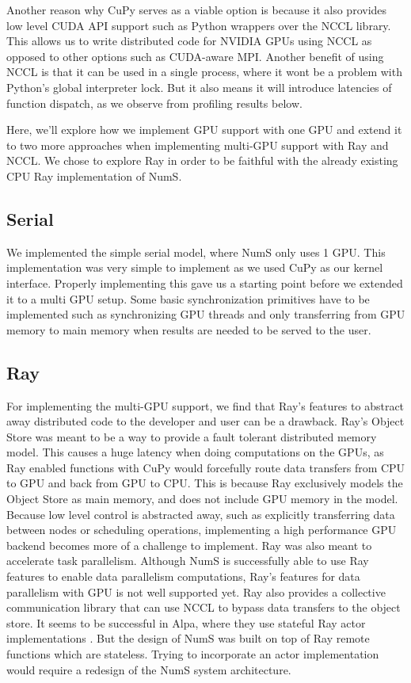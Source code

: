 \documentclass{article}
\begin{document}
Another reason why CuPy serves as a viable option is because it also provides low level CUDA API support such as Python wrappers over the NCCL library. This allows us to write distributed code for NVIDIA GPUs using NCCL as opposed to other options such as CUDA-aware MPI. Another benefit of using NCCL is that it can be used in a single process, where it wont be a problem with Python's global interpreter lock. But it also means it will introduce latencies of function dispatch, as we observe from profiling results below. 

Here, we'll explore how we implement GPU support with one GPU and extend it to two more approaches when implementing multi-GPU support with Ray and NCCL. We chose to explore Ray in order to be faithful with the already existing CPU Ray implementation of NumS.

\subsection{Serial}
We implemented the simple serial model, where NumS only uses 1 GPU. This implementation was very simple to implement as we used CuPy as our kernel interface. Properly implementing this gave us a starting point before we extended it to a multi GPU setup. Some basic synchronization primitives have to be implemented such as synchronizing GPU threads and only transferring from GPU memory to main memory when results are needed to be served to the user.

\subsection{Ray}
For implementing the multi-GPU support, we find that Ray's features to abstract away distributed code to the developer and user can be a drawback. Ray's Object Store was meant to be a way to provide a fault tolerant distributed memory model. \cite{ray} This causes a huge latency when doing computations on the GPUs, as Ray enabled functions with CuPy would forcefully route data transfers from CPU to GPU and back from GPU to CPU. This is because Ray exclusively models the Object Store as main memory, and does not include GPU memory in the model. Because low level control is abstracted away, such as explicitly transferring data between nodes or scheduling operations, implementing a high performance GPU backend becomes more of a challenge to implement. Ray was also meant to accelerate task parallelism. Although NumS is successfully able to use Ray features to enable data parallelism computations, Ray's features for data parallelism with GPU is not well supported yet. Ray also provides a collective communication library that can use NCCL to bypass data transfers to the object store. It seems to be successful in Alpa, where they use stateful Ray actor implementations \cite{alpa}. But the design of NumS was built on top of Ray remote functions which are stateless. Trying to incorporate an actor implementation would require a redesign of the NumS system architecture. 
\end{document}
